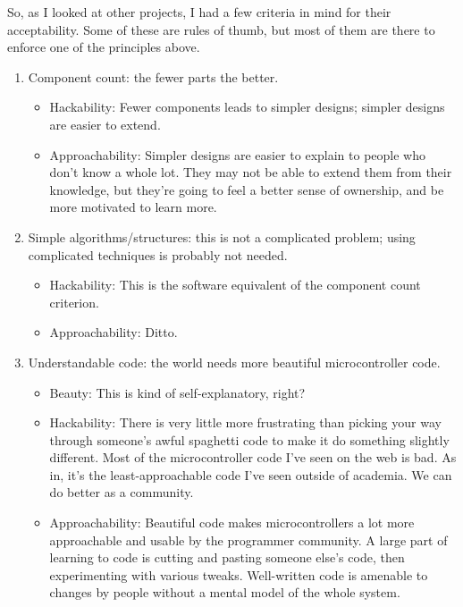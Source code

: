 \documentclass{article}
\begin{document}
So, as I looked at other projects, I had a few criteria in mind for
their acceptability.  Some of these are rules of thumb, but most of
them are there to enforce one of the principles above.

\begin{enumerate}
\item Component count: the fewer parts the better.
\begin{itemize}
\item Hackability: Fewer components leads to simpler designs; simpler
  designs are easier to extend.
\item Approachability: Simpler designs are easier to explain to people
  who don't know a whole lot.  They may not be able to extend them
  from their knowledge, but they're going to feel a better sense of
  ownership, and be more motivated to learn more.
\end{itemize}

\item Simple algorithms/structures: this is not a complicated problem; using
  complicated techniques is probably not needed.
\begin{itemize}
\item Hackability: This is the software equivalent of the component
  count criterion.
\item Approachability: Ditto.
\end{itemize}

\item Understandable code: the world needs more beautiful
  microcontroller code.
\begin{itemize}
\item Beauty: This is kind of self-explanatory, right?
\item Hackability: There is very little more frustrating than picking
  your way through someone's awful spaghetti code to make it do
  something slightly different.  Most of the microcontroller code I've
  seen on the web is bad.  As in, it's the least-approachable code
  I've seen outside of academia.  We can do better as a community.
\item Approachability: Beautiful code makes microcontrollers a lot
  more approachable and usable by the programmer community.  A large
  part of learning to code is cutting and pasting someone else's code,
  then experimenting with various tweaks.  Well-written code is
  amenable to changes by people without a mental model of the whole
  system.
\end{itemize}


\end{enumerate}
\end{document}
